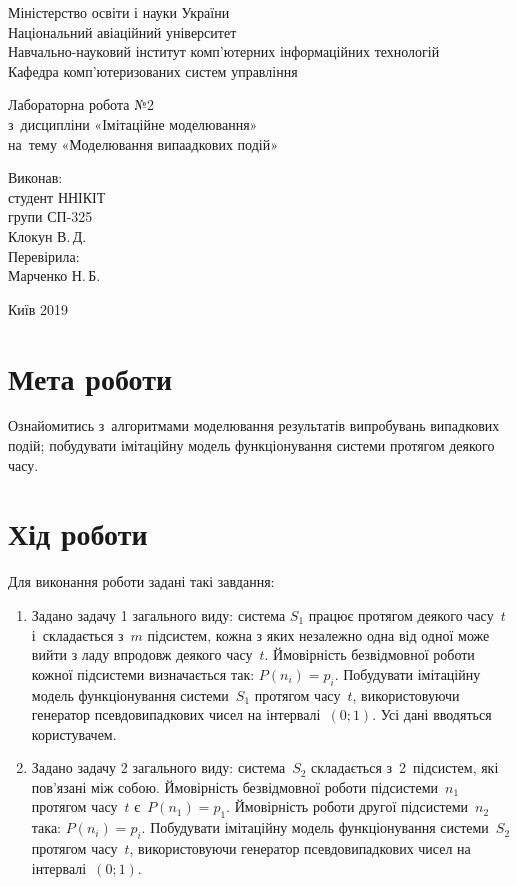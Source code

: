 \documentclass[
	a4paper,
	oneside,
	BCOR = 10mm,
	DIV = 12,
	12pt,
	headings = normal,
]{scrartcl}
\newcommand{\allcaps}[1]{{\addfontfeatures{LetterSpace = 8, Kerning = Off}#1}}
\begin{document}
\begin{titlepage}
		\begin{center}
			Міністерство освіти і науки України\\
			Національний авіаційний університет\\
			Навчально-науковий інститут комп'ютерних інформаційних технологій\\
			Кафедра комп'ютеризованих систем управління

			\vspace{\fill}
				Лабораторна робота №2\\
				з~дисципліни «Імітаційне моделювання»\\
				на~тему «Моделювання випаадкових подій»\\

			\vspace{\fill}

			\begin{flushright}
				Виконав:\\
				студент \allcaps{ННІКІТ}\\
				групи СП-325\\
				Клокун В.\,Д.\\
				Перевірила:\\
				Марченко Н.\,Б.
			\end{flushright}

			Київ 2019
		\end{center}
	\end{titlepage}

	\section{Мета роботи}
		Ознайомитись з~алгоритмами моделювання результатів випробувань випадкових подій; побудувати імітаційну модель функціонування системи протягом деякого часу.

	\section{Хід роботи}
		Для виконання роботи задані такі завдання:
		\begin{enumerate}
			\item Задано задачу 1 загального виду: система $S_1$ працює протягом деякого часу~$t$ і~складається з~$m$ підсистем, кожна з яких незалежно одна від одної може вийти з ладу впродовж деякого часу~$t$. Ймовірність безвідмовної роботи кожної підсистеми визначається так: $P(n_i) = p_i$. Побудувати імітаційну модель функціонування системи~$S_1$ протягом часу~$t$, використовуючи генератор псевдовипадкових чисел на інтервалі~$(0; 1)$. Усі дані вводяться користувачем.
			\item Задано задачу 2 загального виду: система~$S_2$ складається з~2~підсистем, які пов'язані між собою. Ймовірність безвідмовної роботи підсистеми~$n_1$ протягом часу~$t$ є~$P(n_1) = p_1$. Ймовірність роботи другої підсистеми~$n_2$ така: $P(n_i) = p_i$. Побудувати імітаційну модель функціонування системи~$S_2$ протягом часу~$t$, використовуючи генератор псевдовипадкових чисел на інтервалі~$(0; 1)$.
		\end{enumerate}
\end{document}
